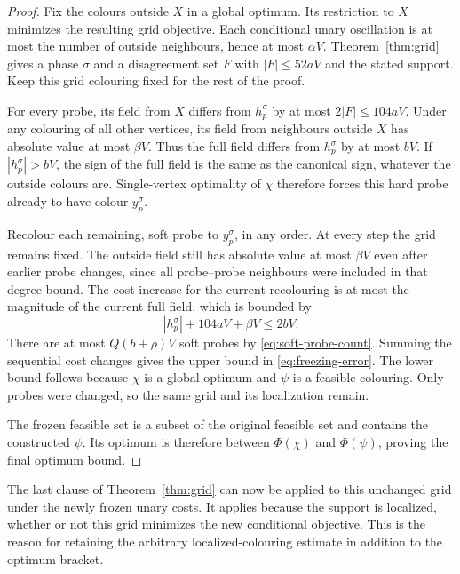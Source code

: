 \begin{proof}
Fix the colours outside $X$ in a global optimum.  Its restriction
to $X$ minimizes the resulting grid objective.  Each conditional unary
oscillation is at most the number of outside neighbours, hence at most
$\alpha V$.  Theorem~\ref{thm:grid} gives a phase $\sigma$ and a
disagreement set $F$ with $|F|\le52aV$ and the stated support.  Keep this
grid colouring fixed for the rest of the proof.

For every probe, its field from $X$ differs from $h_p^\sigma$ by at most
$2|F|\le104aV$.  Under any colouring of all other vertices, its field
from neighbours outside $X$ has absolute value at most $\beta V$.
Thus the full field differs from $h_p^\sigma$ by at most $bV$.
If $|h_p^\sigma|>bV$, the sign of the full field is the same as the
canonical sign, whatever the outside colours are.  Single-vertex
optimality of $\chi$ therefore forces this hard probe already to have
colour $y_p^\sigma$.

Recolour each remaining, soft probe to $y_p^\sigma$, in any order.
At every step the grid remains fixed.  The outside field still has
absolute value at most $\beta V$ even after earlier probe changes, since
all probe--probe neighbours were included in that degree bound.  The
cost increase for the current recolouring is at most the magnitude of
the current full field, which is bounded by
\[
 |h_p^\sigma|+104aV+\beta V\le2bV.
\]
There are at most $Q(b+\rho)V$ soft probes by
\eqref{eq:soft-probe-count}.  Summing the sequential cost changes gives
the upper bound in \eqref{eq:freezing-error}.  The lower bound follows
because $\chi$ is a global optimum and $\psi$ is a feasible colouring.
Only probes were changed, so the same grid and its localization remain.

The frozen feasible set is a subset of the original feasible set and
contains the constructed $\psi$.  Its optimum is therefore between
$\Phi(\chi)$ and $\Phi(\psi)$, proving the final optimum bound.
\end{proof}

The last clause of Theorem~\ref{thm:grid} can now be applied to this
unchanged grid under the newly frozen unary costs.  It applies because
the support is localized, whether or not this grid minimizes the new
conditional objective.  This is the reason for retaining the arbitrary
localized-colouring estimate in addition to the optimum bracket.
